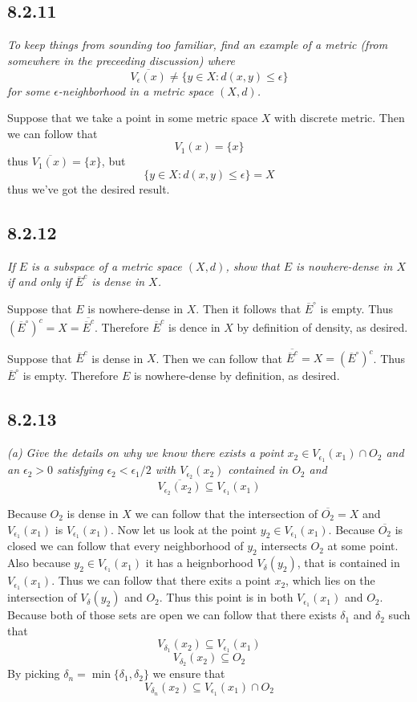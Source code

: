 \documentclass[11pt,oneside,titlepage]{book}
\begin{document}
\subsection*{8.2.11}
\textit{To keep things from sounding too familiar, find an example of a metric
  (from somewhere in the preceeding discussion) where }
$$\overline{V_\epsilon(x)} \neq \{y \in X: d(x, y) \leq \epsilon\}$$
\textit{for some $\epsilon$-neighborhood in a metric space $(X, d)$.}

Suppose that we take a point in some metric space $X$ with discrete metric. Then
we can follow that
$$V_1(x) = \{x\}$$
thus $\overline{V_1(x)} = \{x\}$, but
$$\{y \in X: d(x, y) \leq \epsilon\} = X$$
thus we've got the desired result.

\subsection*{8.2.12}
\textit{If $E$ is a subspace of a metric space $(X, d)$, show that $E$ is nowhere-dense
  in $X$ if and only if $\overline{E}^c$ is dense in $X$.}

Suppose that $E$ is nowhere-dense in $X$. Then it follows that $\overline{E}^\circ$ is empty.
Thus $(\overline{E}^\circ)^c = X = \overline{\overline{E}^c}$.
Therefore $\overline{E}^c$ is dence in $X$ by definition of density, as desired.


Suppose that $\overline{E}^c$ is dense in $X$. Then we can follow that
$\overline{\overline{E}^c} = X = (\overline{E}^\circ)^c$. Thus $\overline{E}^\circ$ is empty.
Therefore $E$ is nowhere-dense by definition, as desired.

\subsection*{8.2.13}
\textit{(a) Give the details on why we know there exists a point
  $x_2 \in V_{\epsilon_1}(x_1) \cap O_2$ and an $\epsilon_2 > 0$ satisfying
  $\epsilon_2 < \epsilon_1/2$ with $V_{\epsilon_2}(x_2)$ contained in $O_2$ and}
$$\overline{V_{\epsilon_2}(x_2)} \subseteq V_{\epsilon_1}(x_1)$$

Because $O_2$ is dense in $X$ we can follow that the intersection of $\overline{O_2} = X$ and
$V_{\epsilon_1}(x_1)$ is $V_{\epsilon_1}(x_1)$. Now let us look at the point
$y_2 \in V_{\epsilon_1}(x_1)$. Because $\overline{O_2}$ is closed we can follow that
every neighborhood of $y_2$ intersects $O_2$ at some point. Also because
$y_2 \in V_{\epsilon_1}(x_1)$ it has a heignborhood $V_\delta(y_2)$, that is contained
in $V_{\epsilon_1}(x_1)$. Thus we can follow that there exits a point $x_2$, which
lies on the intersection of $V_\delta(y_2)$ and $O_2$. Thus this point is in both
$V_{\epsilon_1}(x_1)$ and $O_2$. Because both of those sets are open
we can follow that  there exists $\delta_1$ and $\delta_2$ such that
$$V_{\delta_1}(x_2) \subseteq V_{\epsilon_1}(x_1)$$
$$V_{\delta_2}(x_2) \subseteq O_2$$
By picking $\delta_n = \min\{\delta_1, \delta_2\}$ we ensure that
$$V_{\delta_n}(x_2) \subseteq V_{\epsilon_1}(x_1) \cap O_2$$
\end{document}
